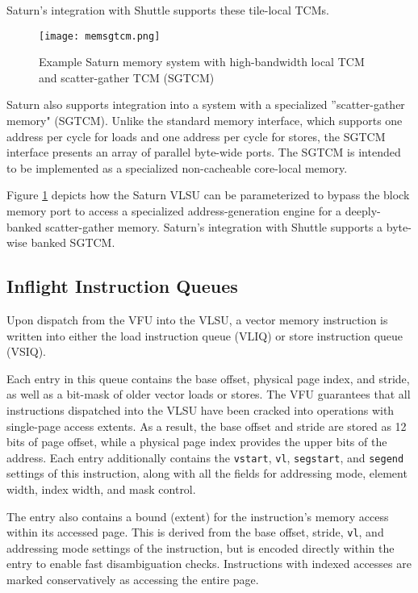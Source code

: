 Saturn's integration with Shuttle supports these tile-local TCMs.

\begin{figure}[h]
  \centering
  \texttt{[image: memsgtcm.png]}
  \caption{Example Saturn memory system with high-bandwidth local TCM and scatter-gather TCM (SGTCM)}
  \label{fig:mem-sgtcm}
\end{figure}

Saturn also supports integration into a system with a specialized ''scatter-gather memory" (SGTCM).
Unlike the standard memory interface, which supports one address per cycle for loads and one address per cycle for stores, the SGTCM interface presents an array of parallel byte-wide ports.
The SGTCM is intended to be implemented as a specialized non-cacheable core-local memory.

Figure \ref{fig:mem-sgtcm} depicts how the Saturn VLSU can be parameterized to bypass the block memory port to access a specialized address-generation engine for a deeply-banked scatter-gather memory.
Saturn's integration with Shuttle supports a byte-wise banked SGTCM.

\subsection{Inflight Instruction Queues}
Upon dispatch from the VFU into the VLSU, a vector memory instruction is written into either the load instruction queue (VLIQ) or store instruction queue (VSIQ).

Each entry in this queue contains the base offset, physical page index, and stride, as well as a bit-mask of older vector loads or stores.
The VFU guarantees that all instructions dispatched into the VLSU have been cracked into operations with single-page access extents.
As a result, the base offset and stride are stored as 12 bits of page offset, while a physical page index provides the upper bits of the address.
Each entry additionally contains the \texttt{vstart}, \texttt{vl}, \texttt{segstart}, and \texttt{segend} settings of this instruction, along with all the fields for addressing mode, element width, index width, and mask control.

The entry also contains a bound (extent) for the instruction's memory access within its accessed page.
This is derived from the base offset, stride, \texttt{vl}, and addressing mode settings of the instruction, but is encoded directly within the entry to enable fast disambiguation checks.
Instructions with indexed accesses are marked conservatively as accessing the entire page.

